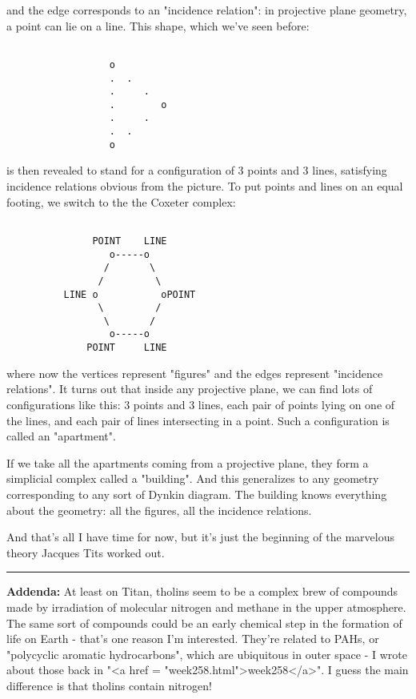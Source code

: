 and the edge corresponds to an "incidence relation": in projective
plane geometry, a point can lie on a line.   This shape, which we've
seen before:


\begin{verbatim}

                  o
                  .  .   
                  .     . 
                  .        o
                  .     .  
                  .  .
                  o
\end{verbatim}
    
is then revealed to stand for a configuration of 3 points and 3 
lines, satisfying incidence relations obvious from the picture.  
To put points and lines on an equal footing, we switch to the  
the Coxeter complex:


\begin{verbatim}

               POINT    LINE      
                  o-----o
                 /       \
                /         \
          LINE o           oPOINT
                \         / 
                 \       /
                  o-----o
              POINT     LINE
\end{verbatim}
    
where now the vertices represent "figures" and the edges represent
"incidence relations".  It turns out that inside any projective
plane, we can find lots of configurations like this: 3 points and
3 lines, each pair of points lying on one of the lines, and each 
pair of lines intersecting in a point.  Such a configuration is
called an "apartment".  

If we take all the apartments coming from a projective plane, they
form a simplicial complex called a "building".  And this generalizes
to any geometry corresponding to any sort of Dynkin diagram.  The
building knows everything about the geometry: all the figures, all
the incidence relations.


And that's all I have time for now, but it's just the beginning of
the marvelous theory Jacques Tits worked out.

\par\noindent\rule{\textwidth}{0.4pt}
\textbf{Addenda:} At least on Titan, tholins seem to be a complex 
brew of compounds made by irradiation of molecular nitrogen and 
methane in the upper atmosphere.  The same sort of compounds 
could be an early chemical step in the formation of life on Earth - 
that's one reason I'm interested.  They're related to PAHs, or
"polycyclic aromatic hydrocarbons", which are ubiquitous
in outer space - I wrote about those back in "<a href = 
"week258.html">week258</a>".  I guess the main difference
is that tholins contain nitrogen!

